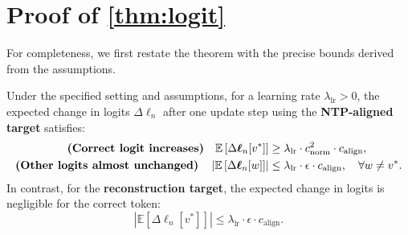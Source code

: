 
\section{Proof of \cref{thm:logit}}
\label{app:proof}

For completeness, we first restate the theorem with the precise bounds derived from the assumptions.

\begingroup
\renewcommand{\thetheorem}{1}
\begin{theorem}

\label{thm:app-logit}

Under the specified setting and assumptions, for a learning rate $\lambda_{\text{lr}}>0$, the expected change in logits $\Delta\boldsymbol{\ell}_{n}$ after one update step using the \textbf{NTP-aligned target} satisfies:
\begin{align}
\text{\textbf{(Correct logit increases)}}\quad
\mathbb{E}\left[\Delta\boldsymbol{\ell}_{n}[v^*]\right] &\geq \lambda_{\text{lr}} \cdot c_{\text{norm}}^2 \cdot c_{\text{align}},\label{eq:app-ntp_correct-logit} \\
\text{\textbf{(Other logits almost unchanged)}}\quad
\left|\mathbb{E}\left[\Delta\boldsymbol{\ell}_{n}[w]\right]\right| &\leq \lambda_{\text{lr}} \cdot \epsilon \cdot c_{\text{align}}, \quad \forall w \neq v^*.
\label{eq:app-ntp-other-logits}
\end{align}
In contrast, for the \textbf{reconstruction target}, the expected change in logits is negligible for the correct token:
\begin{equation}
\label{eq:app-recon-flat}
        |\mathbb{E}\left[\Delta\boldsymbol{\ell}_{n} [v^*] \right]| \leq \lambda_{\text{lr}} \cdot \epsilon \cdot c_{\text{align}}.
\end{equation}

\end{theorem}
\endgroup

